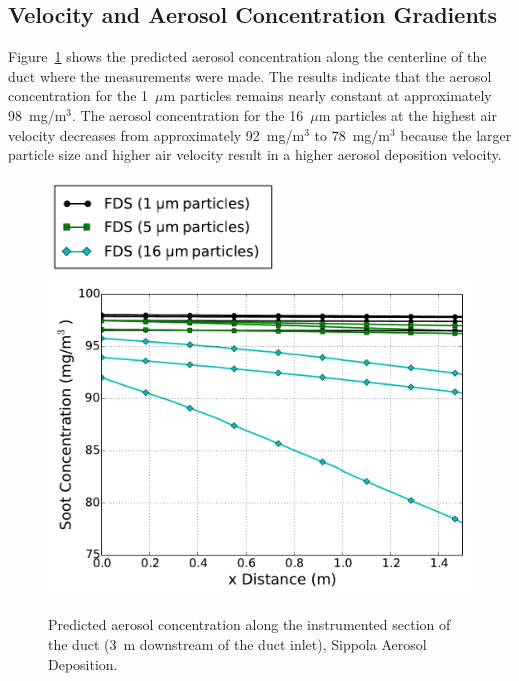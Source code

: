 \subsection{Velocity and Aerosol Concentration Gradients}

Figure~\ref{fig:Sippola_Aerosol_Deposition_Concentration} shows the predicted aerosol concentration along the centerline of the duct where the measurements were made. The results indicate that the aerosol concentration for the 1~$\mu$m particles remains nearly constant at approximately 98~mg/m$^3$. The aerosol concentration for the 16~$\mu$m particles at the highest air velocity decreases from approximately 92~mg/m$^3$ to 78~mg/m$^3$ because the larger particle size and higher air velocity result in a higher aerosol deposition velocity.

\begin{figure}[!ht]
\includegraphics[width=2.4in]{Fig_Sippola_Aerosol_Deposition_Legend_Lines.pdf} \\
\includegraphics[width=5.0in]{Fig_Sippola_Aerosol_Deposition_Soot_Concentration_All.pdf}
\caption[Predicted aerosol concentration, Sippola Aerosol Deposition]
{Predicted aerosol concentration along the instrumented section of the duct (3~m downstream of the duct inlet), Sippola Aerosol Deposition.}
\label{fig:Sippola_Aerosol_Deposition_Concentration}
\end{figure}

